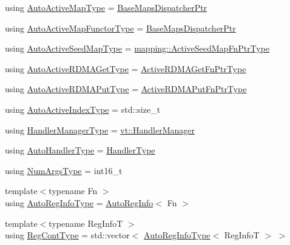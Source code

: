 \begin{DoxyCompactItemize}
\item 
using \hyperlink{namespacevt_1_1auto__registry_ae1bc8f9afc86cc589761fbbf22064601}{Auto\+Active\+Map\+Type} = \hyperlink{namespacevt_1_1auto__registry_aacf403872e2d1ae4d749738c02904c01}{Base\+Maps\+Dispatcher\+Ptr}
\item 
using \hyperlink{namespacevt_1_1auto__registry_a05a587ebd105ed89932361888de7e4ae}{Auto\+Active\+Map\+Functor\+Type} = \hyperlink{namespacevt_1_1auto__registry_aacf403872e2d1ae4d749738c02904c01}{Base\+Maps\+Dispatcher\+Ptr}
\item 
using \hyperlink{namespacevt_1_1auto__registry_a9b5f3bdf0a9a503806cfd4f2747c82f6}{Auto\+Active\+Seed\+Map\+Type} = \hyperlink{namespacevt_1_1mapping_a254b50d55be91c3bd002481b2e96da7e}{mapping\+::\+Active\+Seed\+Map\+Fn\+Ptr\+Type}
\item 
using \hyperlink{namespacevt_1_1auto__registry_a039813f93a5804c77ae612e0318fb335}{Auto\+Active\+R\+D\+M\+A\+Get\+Type} = \hyperlink{namespacevt_ae4fbf97da623bfcd09ee8379de756257}{Active\+R\+D\+M\+A\+Get\+Fn\+Ptr\+Type}
\item 
using \hyperlink{namespacevt_1_1auto__registry_a1f67d3efa37b61040b56258ca59df088}{Auto\+Active\+R\+D\+M\+A\+Put\+Type} = \hyperlink{namespacevt_a23220eaaee4345f7371d35e3aee23c70}{Active\+R\+D\+M\+A\+Put\+Fn\+Ptr\+Type}
\item 
using \hyperlink{namespacevt_1_1auto__registry_ad5ff1c3344b954a1e1212c72c74e4a7a}{Auto\+Active\+Index\+Type} = std\+::size\+\_\+t
\item 
using \hyperlink{namespacevt_1_1auto__registry_a6014637a7590cbfcd2884a23c3e5b576}{Handler\+Manager\+Type} = \hyperlink{structvt_1_1_handler_manager}{vt\+::\+Handler\+Manager}
\item 
using \hyperlink{namespacevt_1_1auto__registry_ae295e18699146815bb7d7674594d95d7}{Auto\+Handler\+Type} = \hyperlink{namespacevt_af64846b57dfcaf104da3ef6967917573}{Handler\+Type}
\item 
using \hyperlink{namespacevt_1_1auto__registry_aebda1d9d765bc9147dc654ad0712c936}{Num\+Args\+Type} = int16\+\_\+t
\item 
{\footnotesize template$<$typename Fn $>$ }\\using \hyperlink{namespacevt_1_1auto__registry_af3f78826dd69454aeb914a3c7bec0a52}{Auto\+Reg\+Info\+Type} = \hyperlink{structvt_1_1auto__registry_1_1_auto_reg_info}{Auto\+Reg\+Info}$<$ Fn $>$
\item 
{\footnotesize template$<$typename Reg\+InfoT $>$ }\\using \hyperlink{namespacevt_1_1auto__registry_a988a4943e4c8fe82b56f5b13bddceb2b}{Reg\+Cont\+Type} = std\+::vector$<$ \hyperlink{namespacevt_1_1auto__registry_af3f78826dd69454aeb914a3c7bec0a52}{Auto\+Reg\+Info\+Type}$<$ Reg\+InfoT $>$ $>$

\end{DoxyCompactItemize}
